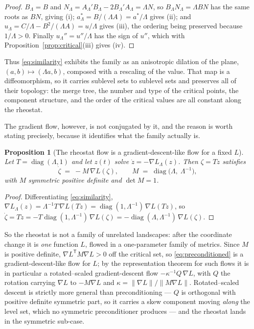 \documentclass[11pt]{article}
\theoremstyle{plain}
\newtheorem{proposition}[theorem]{Proposition}
\theoremstyle{definition}
\theoremstyle{remark}
\newcommand{\grad}{\nabla}
\begin{document}
\begin{proof}
$B_\Lambda = B$ and $N_\Lambda = A_\Lambda'B_\Lambda - 2B_\Lambda'A_\Lambda =
\Lambda N$, so $B_\Lambda N_\Lambda = \Lambda BN$ has the same roots as $BN$,
giving (i); $a^*_\Lambda = B/(\Lambda A) = a^*/\Lambda$ gives (ii); and
$u_\Lambda = C/\Lambda - B^2/(\Lambda A) = u/\Lambda$ gives (iii), the
ordering being preserved because $1/\Lambda > 0$. Finally $u_\Lambda'' =
u''/\Lambda$ has the sign of $u''$, which with
Proposition~\ref{prop:critical}(iii) gives (iv).
\end{proof}

Thus \eqref{eq:similarity} exhibits the family as an anisotropic dilation of
the plane, $(a,b) \mapsto (\Lambda a, b)$, composed with a rescaling of the
value. That map is a diffeomorphism, so it carries sublevel sets to sublevel
sets and preserves all of their topology: the merge tree, the number and type
of the critical points, the component structure, and the order of the critical
values are all constant along the rheostat.

The gradient flow, however, is not conjugated by it, and the reason is worth
stating precisely, because it identifies what the family actually is.

\begin{proposition}[The rheostat flow is a gradient-descent-like flow for a
fixed $L$]\label{prop:rsgd}
Let $T = \operatorname{diag}(\Lambda, 1)$ and let $z(t)$ solve $\dot z =
-\grad L_\Lambda(z)$. Then $\zeta = Tz$ satisfies
\begin{equation}\label{eq:preconditioned}
  \dot\zeta \;=\; -M\,\grad L(\zeta), \qquad
  M \;=\; \operatorname{diag}\bigl(\Lambda,\; \Lambda^{-1}\bigr),
\end{equation}
with $M$ symmetric positive definite and $\det M = 1$.
\end{proposition}

\begin{proof}
Differentiating \eqref{eq:similarity}, $\grad L_\Lambda(z) = \Lambda^{-1}
T\,\grad L(Tz) = \operatorname{diag}(1, \Lambda^{-1})\,\grad L(Tz)$, so
$\dot\zeta = T\dot z = -T\operatorname{diag}(1,\Lambda^{-1})\,\grad L(\zeta)
= -\operatorname{diag}(\Lambda, \Lambda^{-1})\,\grad L(\zeta)$.
\end{proof}

So the rheostat is not a family of unrelated landscapes: after the coordinate
change it is \emph{one} function $L$, flowed in a one-parameter family of
metrics. Since $M$ is positive definite, $\grad L^{\mathsf T}M\grad L > 0$ off
the critical set, so \eqref{eq:preconditioned} is a gradient-descent-like flow
for $L$; by the representation theorem for such flows it is in particular a
rotated--scaled gradient-descent flow $-\kappa^{-1}Q\,\grad L$, with $Q$ the
rotation carrying $\grad L$ to $-M\grad L$ and
$\kappa = \|\grad L\|/\|M\grad L\|$. Rotated--scaled descent is strictly more
general than preconditioning --- $Q$ is orthogonal with positive definite
symmetric part, so it carries a skew component moving \emph{along} the level
set, which no symmetric preconditioner produces --- and the rheostat lands in
the symmetric sub-case.
\end{document}
